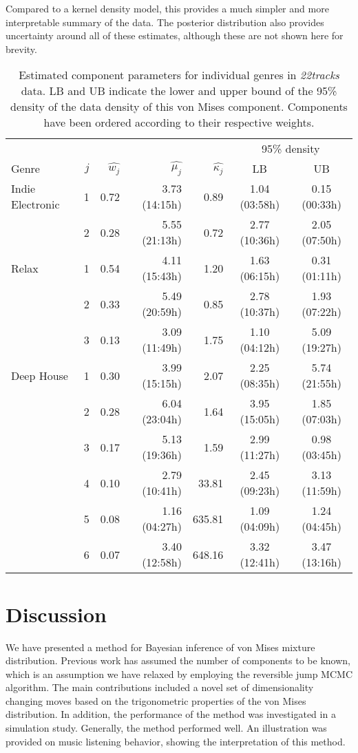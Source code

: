 Compared to a kernel density model, this provides a much simpler and more interpretable summary of the data. The posterior distribution also provides uncertainty around all of these estimates, although these are not shown here for brevity. 

\begin{table}[ht]
	\centering
	\caption{Estimated component parameters for individual genres in \textit{22tracks} data. LB and UB indicate the lower and upper bound of the 95\% density of the data density of this von Mises component. Components have been ordered according to their respective weights.}
	\label{tab:22tracks}
	\begin{tabular}{lrrrrcc}
		\hline
		& & \multicolumn{3}{c}{} & \multicolumn{2}{c}{95\% density} \\
		Genre & $j$ & $\hat{w_j}$ & $\hat{\mu_j}$ & $\hat{\kappa_j}$ & LB & UB \\
		\hline
		Indie Electronic & 1 & 0.72 & 3.73 (14:15h) & 0.89 & 1.04 (03:58h) & 0.15 (00:33h) \\
		& 2 & 0.28 & 5.55 (21:13h) & 0.72 & 2.77 (10:36h) & 2.05 (07:50h) \\
		\hline
		Relax & 1 & 0.54 & 4.11 (15:43h) & 1.20 & 1.63 (06:15h) & 0.31 (01:11h) \\
		& 2 & 0.33 & 5.49 (20:59h) & 0.85 & 2.78 (10:37h) & 1.93 (07:22h) \\
		& 3 & 0.13 & 3.09 (11:49h) & 1.75 & 1.10 (04:12h) & 5.09 (19:27h) \\
		\hline
		Deep House & 1 & 0.30 & 3.99 (15:15h) & 2.07   & 2.25 (08:35h) & 5.74 (21:55h) \\
		& 2 & 0.28 & 6.04 (23:04h) & 1.64   & 3.95 (15:05h) & 1.85 (07:03h) \\
		& 3 & 0.17 & 5.13 (19:36h) & 1.59   & 2.99 (11:27h) & 0.98 (03:45h) \\
		& 4 & 0.10 & 2.79 (10:41h) & 33.81  & 2.45 (09:23h) & 3.13 (11:59h) \\
		& 5 & 0.08 & 1.16 (04:27h) & 635.81 & 1.09 (04:09h) & 1.24 (04:45h) \\
		& 6 & 0.07 & 3.40 (12:58h) & 648.16 & 3.32 (12:41h) & 3.47 (13:16h) \\
		\hline
	\end{tabular}
\end{table}


\section{Discussion}
\label{discussion}
We have presented a method for Bayesian inference of von Mises mixture distribution. Previous work has assumed the number of components to be known, which is an assumption we have relaxed by employing the reversible jump MCMC algorithm. The main contributions included a novel set of dimensionality changing moves based on the trigonometric properties of the von Mises distribution. In addition, the performance of the method was investigated in a simulation study. Generally, the method performed well. An illustration was provided on music listening behavior, showing the interpretation of this method.


